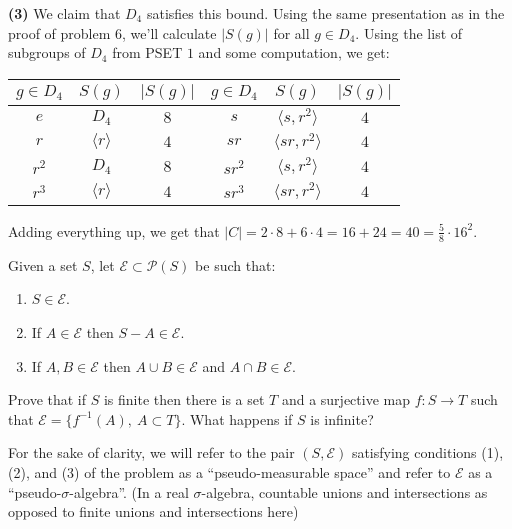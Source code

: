 \documentclass[11pt,letterpaper]{article}
\begin{document}
\textbf{(3)} We claim that $D_4$ satisfies this bound. Using the same presentation as in the proof of problem $6$, we'll calculate $|S(g)|$ for all $g\in D_4$. Using the list of subgroups of $D_4$ from PSET $1$ and some computation, we get:
\begin{center}
  \def\arraystretch{1.5}
  \begin{tabular}{ |c|c|c||c|c|c| }
    \hline
    $g\in D_4$ & $S(g)$ & $|S(g)|$ & $g\in D_4$ & $S(g)$ & $|S(g)|$ \\
    \hline
    \hline
    $e$ & $D_4$ & $8$ & $s$ & $\big\langle s, r^2 \big\rangle$ & $4$ \\  
    \hline
    $r$ & $\big\langle r \big\rangle$ & $4$ & $sr$ & $\big\langle sr, r^2 \big\rangle$ & $4$ \\ 
    \hline
    $r^2$ & $D_4$ & $8$ & $sr^2$ & $\big\langle s, r^2 \big\rangle$ & $4$  \\ 
    \hline
    $r^3$ & $\big\langle r \big\rangle$ & $4$ & $sr^3$ & $\big\langle sr, r^2 \big\rangle$ & $4$ \\
    \hline  
  \end{tabular}
\end{center}
Adding everything up, we get that $|C|=2\cdot 8+6\cdot 4=16+24=40=\frac{5}{8}\cdot 16^2$. 
\pagebreak
\begin{problem}
    Given a set $S$, let $\mathcal{E}\subset \mathcal{P}(S)$ be such that:
    \begin{enumerate}
        \item $S\in \mathcal{E}$.
        \item If $A\in \mathcal{E}$ then $S-A\in \mathcal{E}$.
        \item If $A,B\in \mathcal{E}$ then $A\cup B\in \mathcal{E}$ and $A\cap B\in \mathcal{E}$.
    \end{enumerate}

    Prove that if $S$ is finite then there is a set $T$ and a surjective map $f:S\to T$ such that $\mathcal{E}=\{f^{-1}(A),\ A\subset T\}$. What happens if $S$ is infinite?
\end{problem}

For the sake of clarity, we will refer to the pair $(S, \mathcal{E})$ satisfying conditions (1), (2), and (3) of the problem as a ``pseudo-measurable space'' and refer to $\mathcal{E}$ as a  ``pseudo-$\sigma$-algebra''. (In a real $\sigma$-algebra, countable unions and intersections as opposed to finite unions and intersections here)
\end{document}
